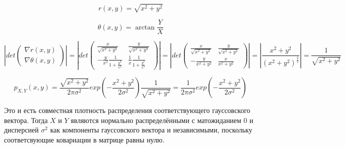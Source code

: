 \documentclass{article}
\begin{document}
\[ r(x, y) = \sqrt{x ^ 2 + y ^ 2} \]

\[ \theta(x, y) = \arctan{\frac{Y}{X}} \]

\[ \left| det \begin{pmatrix} \nabla r(x, y) \\ \nabla \theta(x, y) \end{pmatrix} \right| = \left| det \begin{pmatrix} \frac{x}{\sqrt{x^2 + y^2}} & \frac{y}{\sqrt{x^2 + y^2}} \\ -\frac{y}{x^2} \frac{1}{1 + \frac{y^2}{x^2}} & \frac{1}{x} \frac{1}{1 + \frac{y^2}{x^2}} \end{pmatrix} \right| = \left| det \begin{pmatrix} \frac{x}{\sqrt{x^2 + y^2}} & \frac{y}{\sqrt{x^2 + y^2}} \\ -\frac{y}{x^2 + y^2} & \frac{x}{x^2 + y^2} \end{pmatrix} \right| = \left| \frac{x^2 + y^2}{(x^2 + y^2)^{\frac{3}{2}}}  \right| =  \frac{1}{\sqrt{x^2 + y^2}}\]

\[ p_{X, Y}(x, y) = \frac{\sqrt{x^2 + y^2}}{2 \pi \sigma ^ 2} exp \left( -\frac{x^2 + y^2}{2 \sigma^2} \right) \frac{1}{\sqrt{x^2 + y^2}} = \frac{1}{2 \pi \sigma ^ 2} exp \left( -\frac{x^2 + y^2}{2 \sigma^2} \right) \]

Это и есть совместная плотность распределения соответствующего гауссовского вектора. Тогда $X$ и $Y$ являются нормально распределёнными с матожиданием $0$ и дисперсией $\sigma ^ 2$ как компоненты гауссовского вектора и независимыми, поскольку соответсвующие ковариации в матрице равны нулю.
    
\end{document}
